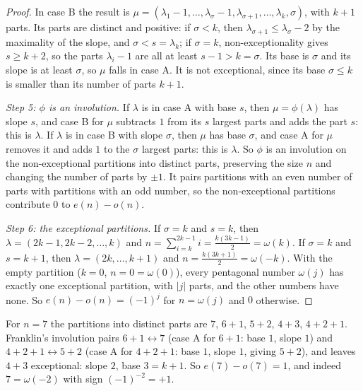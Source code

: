 \begin{proof}
In case B the result is $\mu = (\lambda_1 - 1, \ldots, \lambda_\sigma - 1, \lambda_{\sigma+1}, \ldots, \lambda_k, \sigma)$, with $k + 1$ parts. Its parts are distinct and positive: if $\sigma < k$,
then $\lambda_{\sigma+1} \leq \lambda_\sigma - 2$ by the maximality of the slope, and $\sigma < s = \lambda_k$; if $\sigma = k$, non-exceptionality gives $s \geq k + 2$, so the parts $\lambda_i - 1$ are
all at least $s - 1 > k = \sigma$. Its base is $\sigma$ and its slope is at least $\sigma$, so $\mu$ falls in case A. It is not exceptional, since its base $\sigma \leq k$ is smaller than its number of
parts $k + 1$.

\emph{Step 5: $\phi$ is an involution.} If $\lambda$ is in case A with base $s$, then $\mu = \phi(\lambda)$ has slope $s$, and case B for $\mu$ subtracts $1$ from its $s$ largest parts and adds the
part $s$: this is $\lambda$. If $\lambda$ is in case B with slope $\sigma$, then $\mu$ has base $\sigma$, and case A for $\mu$ removes it and adds $1$ to the $\sigma$ largest parts: this is $\lambda$.
So $\phi$ is an involution on the non-exceptional partitions into distinct parts, preserving the size $n$ and changing the number of parts by $\pm 1$. It pairs partitions with an even number of parts
with partitions with an odd number, so the non-exceptional partitions contribute $0$ to $e(n) - o(n)$.

\emph{Step 6: the exceptional partitions.} If $\sigma = k$ and $s = k$, then $\lambda = (2k - 1, 2k - 2, \ldots, k)$ and $n = \sum_{i=k}^{2k-1}i = \frac{k(3k - 1)}{2} = \omega(k)$. If $\sigma = k$
and $s = k + 1$, then $\lambda = (2k, \ldots, k + 1)$ and $n = \frac{k(3k + 1)}{2} = \omega(-k)$. With the empty partition ($k = 0$, $n = 0 = \omega(0)$), every pentagonal number $\omega(j)$ has
exactly one exceptional partition, with $|j|$ parts, and the other numbers have none. So $e(n) - o(n) = (-1)^j$ for $n = \omega(j)$ and $0$ otherwise.
\end{proof}

\begin{example}\label{generating-functions:example-franklin}
For $n = 7$ the partitions into distinct parts are $7$, $6 + 1$, $5 + 2$, $4 + 3$, $4 + 2 + 1$. Franklin's involution pairs $6 + 1 \leftrightarrow 7$ (case A for $6 + 1$: base $1$, slope $1$) and
$4 + 2 + 1 \leftrightarrow 5 + 2$ (case A for $4 + 2 + 1$: base $1$, slope $1$, giving $5 + 2$), and leaves $4 + 3$ exceptional: slope $2$, base $3 = k + 1$. So $e(7) - o(7) = 1$, and indeed
$7 = \omega(-2)$ with sign $(-1)^{-2} = +1$.
\end{example}

